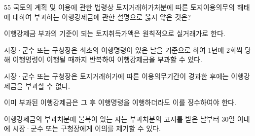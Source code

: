 \begin{question}{55}
국토의 계획 및 이용에 관한 법령상 토지거래허가처분에 따른 토지이용의무의 해태에 대하여 부과하는 이행강제금에 관한 설명으로 옳지 않은 것은?
\begin{choices}
  \item 이행강제금 부과의 기준이 되는 토지취득가액은 원칙적으로 실거래가로 한다.
  \item 시장·군수 또는 구청장은 최초의 이행명령이 있은 날을 기준으로 하여 1년에 2회씩 당해 이행명령이 이행될 때까지 반복하여 이행강제금을 부과할 수 있다.
  \item 시장·군수 또는 구청장은 토지거래허가에 따른 이용의무기간이 경과한 후에는 이행강제금을 부과할 수 없다.
  \item 이미 부과된 이행강제금은 그 후 이행명령을 이행하더라도 이를 징수하여야 한다.
  \item 이행강제금의 부과처분에 불복이 있는 자는 부과처분의 고지를 받은 날부터 30일 이내에 시장·군수 또는 구청장에게 이의를 제기할 수 있다.
\end{choices}
\end{question}
